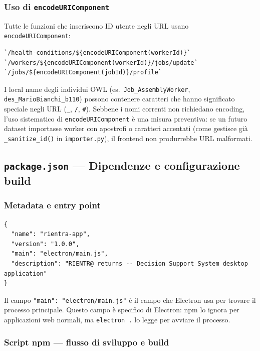 \documentclass[a4paper,12pt]{article}
\begin{document}
\subsubsection{Uso di \texttt{encodeURIComponent}}

Tutte le funzioni che inseriscono ID utente negli URL usano
\texttt{encodeURIComponent}:
\begin{lstlisting}
`/health-conditions/${encodeURIComponent(workerId)}`
`/workers/${encodeURIComponent(workerId)}/jobs/update`
`/jobs/${encodeURIComponent(jobId)}/profile`
\end{lstlisting}
I local name degli individui OWL (es.\ \texttt{Job\_AssemblyWorker},
\texttt{des\_MarioBianchi\_b110}) possono contenere caratteri che hanno
significato speciale negli URL (\texttt{\_}, \texttt{/}, \texttt{\#}).
Sebbene i nomi correnti non richiedano encoding, l'uso sistematico di
\texttt{encodeURIComponent} \`{e} una misura preventiva: se un futuro
dataset importasse worker con apostrofi o caratteri accentati (come
gestisce gi\`{a} \texttt{\_sanitize\_id()} in \texttt{importer.py}),
il frontend non produrrebbe URL malformati.

\subsection{\texttt{package.json} --- Dipendenze e configurazione build}

\subsubsection{Metadata e entry point}
\vspace{2pt}
\begin{lstlisting}[language={}]
{
  "name": "rientra-app",
  "version": "1.0.0",
  "main": "electron/main.js",
  "description": "RIENTR@ returns -- Decision Support System desktop application"
}
\end{lstlisting}

\noindent Il campo \texttt{"main": "electron/main.js"} \`{e} il campo che Electron
usa per trovare il processo principale. Questo campo \`{e} specifico
di Electron: npm lo ignora per applicazioni web normali, ma
\texttt{electron .} lo legge per avviare il processo.

\subsubsection{Script npm --- flusso di sviluppo e build}
\end{document}
